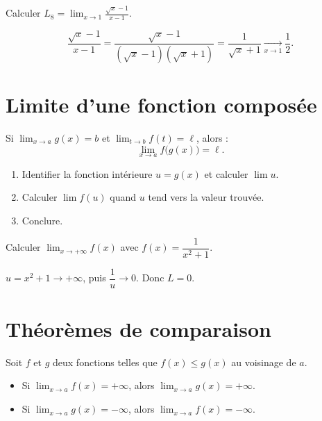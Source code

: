 \begin{exemple}
	Calculer $\displaystyle L_8=\lim_{x\to 1}\frac{\sqrt{x}-1}{x-1}$.
	
	\[
	\frac{\sqrt{x}-1}{x-1}
	= \frac{\sqrt{x}-1}{(\sqrt{x}-1)(\sqrt{x}+1)}
	= \frac{1}{\sqrt{x}+1}
	\xrightarrow[x\to 1]{} \frac{1}{2}.
	\]
\end{exemple}

\section{Limite d'une fonction composée}

\begin{theoreme}
	Si $\displaystyle\lim_{x\to a}g(x)=b$ et $\displaystyle\lim_{t\to b}f(t)=\ell$,
	alors :
	\[
	\lim_{x\to a} f\bigl(g(x)\bigr) = \ell.
	\]
\end{theoreme}

\begin{methode}
	\begin{enumerate}
		\item Identifier la fonction intérieure $u=g(x)$ et calculer $\lim u$.
		\item Calculer $\lim f(u)$ quand $u$ tend vers la valeur trouvée.
		\item Conclure.
	\end{enumerate}
\end{methode}

\begin{exemple}
	Calculer $\displaystyle\lim_{x\to+\infty}f(x)$ avec
	$f(x)=\dfrac{1}{x^2+1}$.
	
	$u=x^2+1\to+\infty$, puis $\dfrac{1}{u}\to 0$. Donc $L=0$.
\end{exemple}

\section{Théorèmes de comparaison}

\begin{theoreme}
	Soit $f$ et $g$ deux fonctions telles que $f(x)\leq g(x)$
	au voisinage de $a$.
	\begin{itemize}
		\item Si $\displaystyle\lim_{x\to a}f(x)=+\infty$, alors
		$\displaystyle\lim_{x\to a}g(x)=+\infty$.
		\item Si $\displaystyle\lim_{x\to a}g(x)=-\infty$, alors
		$\displaystyle\lim_{x\to a}f(x)=-\infty$.
	\end{itemize}
\end{theoreme}


